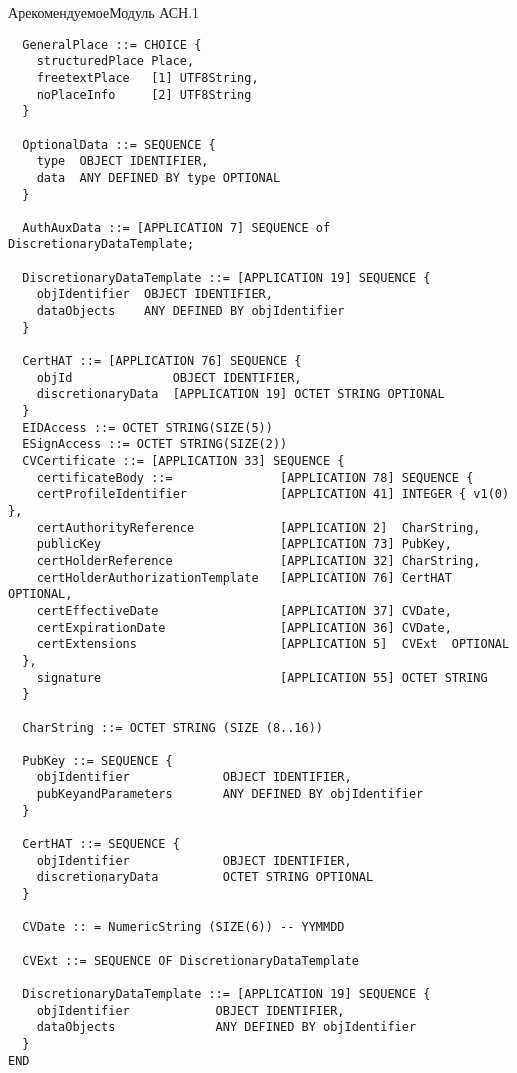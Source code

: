 \begin{appendix}{А}{рекомендуемое}{Модуль АСН.1}
\begin{verbatim}
  GeneralPlace ::= CHOICE {
    structuredPlace Place,
    freetextPlace   [1] UTF8String,
    noPlaceInfo     [2] UTF8String
  }
  
  OptionalData ::= SEQUENCE {
    type  OBJECT IDENTIFIER,
    data  ANY DEFINED BY type OPTIONAL
  }

  AuthAuxData ::= [APPLICATION 7] SEQUENCE of DiscretionaryDataTemplate;

  DiscretionaryDataTemplate ::= [APPLICATION 19] SEQUENCE {
    objIdentifier  OBJECT IDENTIFIER,
    dataObjects    ANY DEFINED BY objIdentifier
  }

  CertHAT ::= [APPLICATION 76] SEQUENCE {
    objId              OBJECT IDENTIFIER,
    discretionaryData  [APPLICATION 19] OCTET STRING OPTIONAL
  }
  EIDAccess ::= OCTET STRING(SIZE(5))
  ESignAccess ::= OCTET STRING(SIZE(2))
  CVCertificate ::= [APPLICATION 33] SEQUENCE {
    certificateBody ::=               [APPLICATION 78] SEQUENCE {
    certProfileIdentifier             [APPLICATION 41] INTEGER { v1(0) },
    certAuthorityReference            [APPLICATION 2]  CharString,
    publicKey                         [APPLICATION 73] PubKey,
    certHolderReference               [APPLICATION 32] CharString,
    certHolderAuthorizationTemplate   [APPLICATION 76] CertHAT  OPTIONAL,
    certEffectiveDate                 [APPLICATION 37] CVDate,
    certExpirationDate                [APPLICATION 36] CVDate,
    certExtensions                    [APPLICATION 5]  CVExt  OPTIONAL
  },
    signature                         [APPLICATION 55] OCTET STRING
  }

  CharString ::= OCTET STRING (SIZE (8..16))

  PubKey ::= SEQUENCE {
    objIdentifier             OBJECT IDENTIFIER,
    pubKeyandParameters       ANY DEFINED BY objIdentifier 
  }

  CertHAT ::= SEQUENCE {
    objIdentifier             OBJECT IDENTIFIER,
    discretionaryData         OCTET STRING OPTIONAL
  }

  CVDate :: = NumericString (SIZE(6)) -- YYMMDD

  CVExt ::= SEQUENCE OF DiscretionaryDataTemplate

  DiscretionaryDataTemplate ::= [APPLICATION 19] SEQUENCE {
    objIdentifier            OBJECT IDENTIFIER,
    dataObjects              ANY DEFINED BY objIdentifier
  }
END
\end{verbatim}

\end{appendix}
